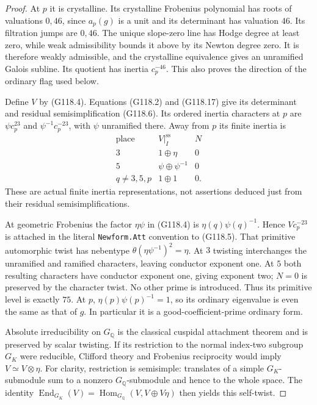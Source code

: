 \begin{proof}
At $p$ it is crystalline.  Its crystalline Frobenius polynomial has roots
of valuations $0,46$, since $a_p(g)$ is a unit and its determinant has
valuation $46$.  Its filtration jumps are $0,46$.
The unique slope-zero line has Hodge degree at least zero, while weak
admissibility bounds it above by its Newton degree zero.  It is therefore
weakly admissible, and the crystalline equivalence gives an unramified
Galois subline.  Its quotient has inertia $c_p^{-46}$.
This also proves the direction of the ordinary flag used below.

Define $V$ by (G118.4).  Equations (G118.2) and (G118.17) give its determinant
and residual semisimplification (G118.6).  Its ordered inertia characters
at $p$ are $\psi c_p^{23}$ and $\psi^{-1}c_p^{-23}$, with $\psi$ unramified
there.  Away from $p$ its finite inertia is
\[
 \begin{array}{c|c|c}
 \text{place}&V|_I^{\mathrm{ss}}&N\\ \hline
 3&1\oplus\eta&0\\
 5&\psi\oplus\psi^{-1}&0\\
 q\ne3,5,p&1\oplus1&0.
 \end{array}                                             \tag{G118.18}
\]
These are actual finite inertia representations, not assertions deduced just
from their residual semisimplifications.

At geometric Frobenius the factor $\eta\psi$ in (G118.4) is
$\eta(q)\psi(q)^{-1}$.  Hence $V c_p^{-23}$ is attached in the literal
\texttt{Newform.Att} convention to (G118.5).
That primitive automorphic twist has nebentype
$\theta(\eta\psi^{-1})^2=\eta$.
At $3$ twisting interchanges the unramified and ramified characters, leaving
conductor exponent one.  At $5$ both resulting characters have conductor
exponent one, giving exponent two; $N=0$ is preserved by the character twist.
No other prime is introduced.
Thus its primitive level is exactly $75$.
At $p$, $\eta(p)\psi(p)^{-1}=1$, so its ordinary eigenvalue is even the same
as that of $g$.  In particular it is a good-coefficient-prime ordinary form.

Absolute irreducibility on $G_{\mathbb Q}$ is the classical cuspidal attachment
theorem and is preserved by scalar twisting.  If its restriction to the normal
index-two subgroup $G_K$ were reducible, Clifford theory and Frobenius
reciprocity would imply $V\simeq V\otimes\eta$.
For clarity, restriction is semisimple: translates of a simple $G_K$-submodule
sum to a nonzero $G_{\mathbb Q}$-submodule and hence to the whole space.
The identity
$\operatorname{End}_{G_K}(V)=
 \operatorname{Hom}_{G_{\mathbb Q}}(V,V\oplus V\eta)$
then yields this self-twist.


\end{proof}
